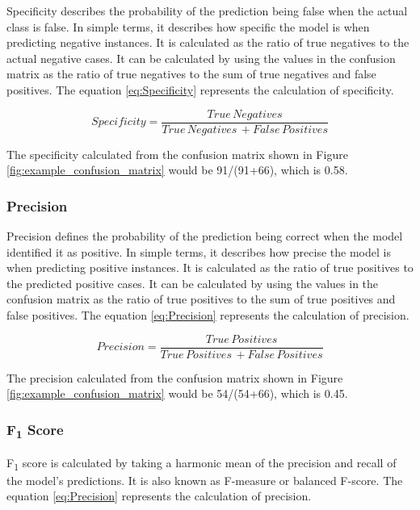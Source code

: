 \documentclass[11pt,openright]{report}
\begin{document}
Specificity describes the probability of the prediction being false when the actual class is false. In simple terms, it describes how specific the model is when predicting negative instances. It is calculated as the ratio of true negatives to the actual negative cases. It can be calculated by using the values in the confusion matrix as the ratio of true negatives to the sum of true negatives and false positives. The equation \ref{eq:Specificity}  represents the calculation of specificity.

\begin{equation}
Specificity = \dfrac{True\, Negatives }{True\, Negatives\, + False\, Positives} \label{eq:Specificity} 
 \end{equation}

The specificity calculated from the confusion matrix shown in Figure \ref{fig:example_confusion_matrix} would be 91/(91+66), which is 0.58.

\subsubsection{Precision}
Precision defines the probability of the prediction being correct when the model identified it as positive. In simple terms, it describes how precise the model is when predicting positive instances. It is calculated as the ratio of true positives to the predicted positive cases. It can be calculated by using the values in the confusion matrix as the ratio of true positives to the sum of true positives and false positives. The equation \ref{eq:Precision}  represents the calculation of precision.

\begin{equation}
Precision = \dfrac{True\, Positives }{True\, Positives\, + False\, Positives} \label{eq:Precision} 
 \end{equation}

The precision calculated from the confusion matrix shown in Figure \ref{fig:example_confusion_matrix} would be 54/(54+66), which is 0.45.

\subsubsection{F\textsubscript1 Score}

F\textsubscript{1} score is calculated by taking a harmonic mean of the precision and recall of the model's predictions. It is also known as F-measure or balanced F-score. The equation \ref{eq:Precision}  represents the calculation of precision.
\end{document}
